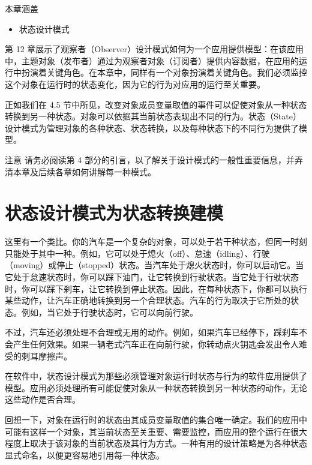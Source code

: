 \begin{myChapterIntro}{本章涵盖}
\begin{itemize}
\item 状态设计模式
\end{itemize}
\end{myChapterIntro}

第 12 章展示了观察者（Observer）设计模式如何为一个应用提供模型：在该应用中，主题对象（发布者）通过为观察者对象（订阅者）提供内容数据，在应用的运行中扮演着关键角色。在本章中，同样有一个对象扮演着关键角色。我们必须监控这个对象在运行时的状态变化，因为它的行为对应用的运行至关重要。

正如我们在 4.5 节中所见，改变对象成员变量取值的事件可以促使对象从一种状态转换到另一种状态。对象可以依据其当前状态表现出不同的行为。状态（State）设计模式为管理对象的各种状态、状态转换，以及每种状态下的不同行为提供了模型。


\begin{myWarning}{注意}
请务必阅读第 4 部分的引言，以了解关于设计模式的一般性重要信息，并弄清本章及后续各章如何讲解每一种模式。
\end{myWarning}

\section{状态设计模式为状态转换建模}

这里有一个类比。你的汽车是一个复杂的对象，可以处于若干种状态，但同一时刻只能处于其中一种。例如，它可以处于熄火（off）、怠速（idling）、行驶（moving）或停止（stopped）状态。当汽车处于熄火状态时，你可以启动它。当它处于怠速状态时，你可以踩下油门，让它转换到行驶状态。当它处于行驶状态时，你可以踩下刹车，让它转换到停止状态。因此，在每种状态下，你都可以执行某些动作，让汽车正确地转换到另一个合理状态。汽车的行为取决于它所处的状态。例如，当它处于行驶状态时，它可以向前行驶。

不过，汽车还必须处理不合理或无用的动作。例如，如果汽车已经停下，踩刹车不会产生任何效果。如果一辆老式汽车正在向前行驶，你转动点火钥匙会发出令人难受的刺耳摩擦声。

在软件中，状态设计模式为那些必须管理对象运行时状态与行为的软件应用提供了模型。应用必须处理所有可能促使对象从一种状态转换到另一种状态的动作，无论这些动作是否合理。

回想一下，对象在运行时的状态由其成员变量取值的集合唯一确定。我们的应用中可能有这样一个对象，其当前状态至关重要、需要监控，而应用的整个运行在很大程度上取决于该对象的当前状态及其行为方式。一种有用的设计策略是为各种状态显式命名，以便更容易地引用每一种状态。

